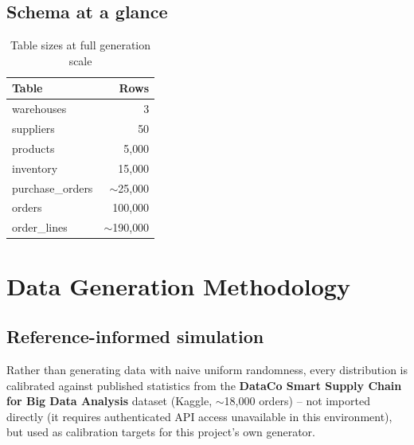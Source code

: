 \documentclass[11pt,a4paper]{report}
\begin{document}
\section{Schema at a glance}

\begin{table}[H]
\centering
\caption{Table sizes at full generation scale}
\begin{tabular}{lr}
\toprule
\textbf{Table} & \textbf{Rows} \\
\midrule
warehouses & 3 \\
suppliers & 50 \\
products & 5{,}000 \\
inventory & 15{,}000 \\
purchase\_orders & $\sim$25{,}000 \\
orders & 100{,}000 \\
order\_lines & $\sim$190{,}000 \\
\bottomrule
\end{tabular}
\end{table}

\chapter{Data Generation Methodology}
\label{sec:data-gen}

\section{Reference-informed simulation}

Rather than generating data with naive uniform randomness, every
distribution is calibrated against published statistics from the
\textbf{DataCo Smart Supply Chain for Big Data Analysis} dataset (Kaggle,
$\sim$18{,}000 orders) -- not imported directly (it requires authenticated
API access unavailable in this environment), but used as calibration
targets for this project's own generator.
\end{document}
